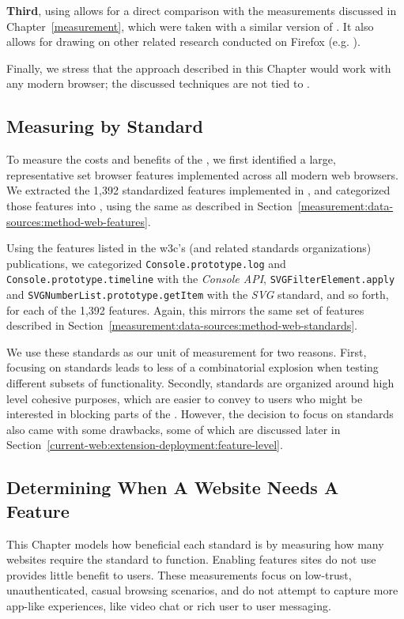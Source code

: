 \textbf{Third}, using \FF allows for a direct comparison with the measurements
discussed in Chapter~\ref{measurement}, which were taken with a similar version
of \FF.  It also allows for drawing on other related research conducted on
Firefox (e.g. \cite{shin2011evaluating}).

Finally, we stress that the approach described in this Chapter would work with
any modern browser; the discussed techniques are not tied to \FFWithVersion.


\subsection{Measuring by Standard}
To measure the costs and benefits of the \WAPI, we first identified a large,
representative set browser features implemented across all modern web browsers.
We extracted the 1,392 standardized \WAPI features implemented in \FF, and
categorized those features into \NumStandards \WASs, using the same as
described in Section~\ref{measurement:data-sources:method-web-features}.

Using the features listed in the \gls{w3c}'s (and related standards
organizations) publications, we categorized \texttt{Console.prototype.log} and
\texttt{Console.prototype.timeline} with the \emph{Console API},
\texttt{SVGFilterElement.apply} and \texttt{SVGNumberList.prototype.getItem}
with the \emph{SVG} standard, and so forth, for each of the 1,392 features.
Again, this mirrors the same set of features described in
Section~\ref{measurement:data-sources:method-web-standards}.

We use these \NumStandards standards as our unit of \WAPI measurement for two
reasons.  First, focusing on \NumStandards standards leads to less of a
combinatorial explosion when testing different subsets of \WAPI functionality.
Secondly, standards are organized around high level cohesive purposes, which
are easier to convey to users who might be interested in blocking parts of the
\WAPI. However, the decision to focus on standards also came with some
drawbacks, some of which are discussed later in
Section~\ref{current-web:extension-deployment:feature-level}.


\subsection{Determining When A Website Needs A Feature}
\label{cost-benefit:methodology:manual-inspection}
This Chapter models how beneficial each \WAPI standard is by measuring
how many websites require the standard to function.  Enabling features sites do not
use provides little benefit to users.  These measurements focus on
low-trust, unauthenticated, casual browsing scenarios, and do not
attempt to capture more app-like experiences, like video chat or rich
user to user messaging.

